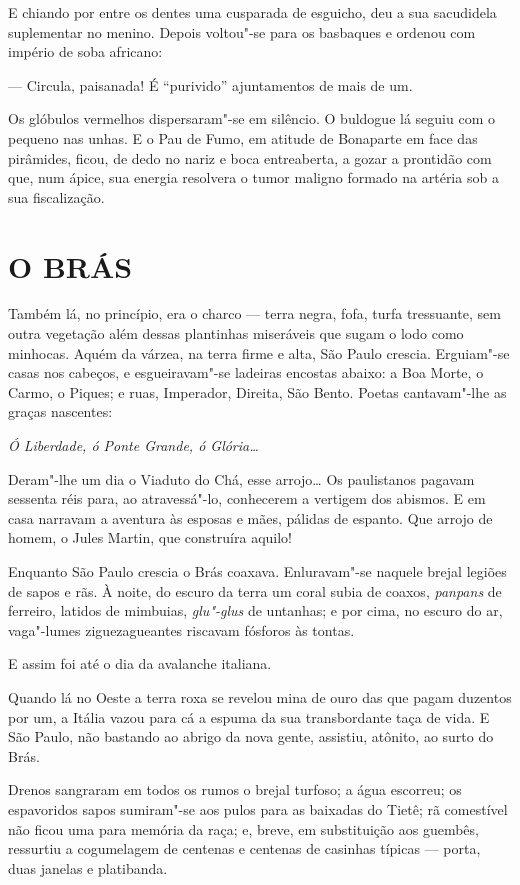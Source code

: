 E chiando por entre os dentes uma cusparada de esguicho, deu a sua
sacudidela suplementar no menino. Depois voltou"-se para os basbaques e
ordenou com império de soba africano:

--- Circula, paisanada! É ``purivido'' ajuntamentos de mais de um.

Os glóbulos vermelhos dispersaram"-se em silêncio. O buldogue lá seguiu
com o pequeno nas unhas. E o Pau de Fumo, em atitude de Bonaparte em
face das pirâmides, ficou, de dedo no nariz e boca entreaberta, a gozar
a prontidão com que, num ápice, sua energia resolvera o tumor maligno
formado na artéria sob a sua fiscalização.

\section*{O BRÁS}

Também lá, no princípio, era o charco --- terra negra, fofa, turfa
tressuante, sem outra vegetação além dessas plantinhas miseráveis que
sugam o lodo como minhocas. Aquém da várzea, na terra firme e alta, São
Paulo crescia. Erguiam"-se casas nos cabeços, e esgueiravam"-se ladeiras
encostas abaixo: a Boa Morte, o Carmo, o Piques; e ruas, Imperador,
Direita, São Bento. Poetas cantavam"-lhe as graças nascentes:

\emph{Ó Liberdade, ó Ponte Grande, ó Glória\ldots{}}

Deram"-lhe um dia o Viaduto do Chá, esse arrojo\ldots{} Os paulistanos pagavam
sessenta réis para, ao atravessá"-lo, conhecerem a vertigem dos abismos.
E em casa narravam a aventura às esposas e mães, pálidas de espanto. Que
arrojo de homem, o Jules Martin, que construíra aquilo!

Enquanto São Paulo crescia o Brás coaxava. Enluravam"-se naquele brejal
legiões de sapos e rãs. À noite, do escuro da terra um coral subia de
coaxos, \emph{panpans} de ferreiro, latidos de mimbuias, \emph{glu"-glus}
de untanhas; e por cima, no escuro do ar, vaga"-lumes ziguezagueantes
riscavam fósforos às tontas.

E assim foi até o dia da avalanche italiana.

Quando lá no Oeste a terra roxa se revelou mina de ouro das que pagam
duzentos por um, a Itália vazou para cá a espuma da sua transbordante
taça de vida. E São Paulo, não bastando ao abrigo da nova gente,
assistiu, atônito, ao surto do Brás.

Drenos sangraram em todos os rumos o brejal turfoso; a água escorreu; os
espavoridos sapos sumiram"-se aos pulos para as baixadas do Tietê; rã
comestível não ficou uma para memória da raça; e, breve, em substituição
aos guembês, ressurtiu a cogumelagem de centenas e centenas de casinhas
típicas --- porta, duas janelas e platibanda.


